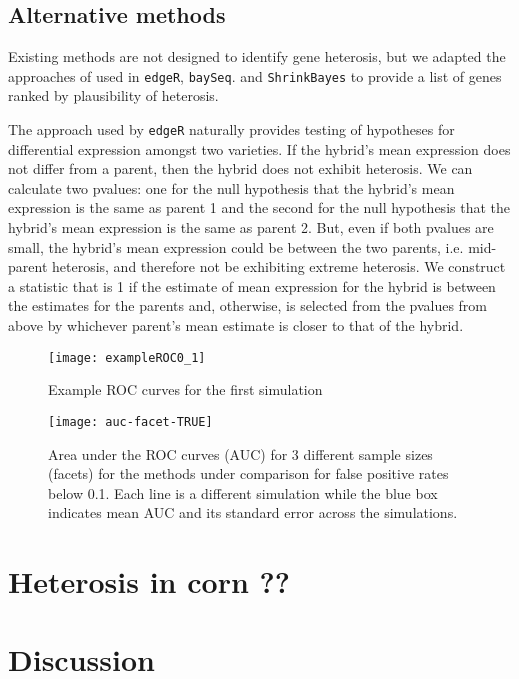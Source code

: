 \documentclass[useAMS,usenatbib,referee]{biom}
\begin{document}
\subsection{Alternative methods}

Existing methods are not designed to identify gene heterosis, but we adapted the approaches of used in {\tt edgeR}, {\tt baySeq}. and {\tt ShrinkBayes} to provide a list of genes ranked by plausibility of heterosis. 

The approach used by {\tt edgeR} naturally provides testing of hypotheses for differential expression amongst two varieties. If the hybrid's mean expression does not differ from a parent, then the hybrid does not exhibit heterosis. We can calculate two pvalues: one for the null hypothesis that the hybrid's mean expression is the same as parent 1 and the second for the null hypothesis that the hybrid's mean expression is the same as parent 2. But, even if both pvalues are small, the hybrid's mean expression could be between the two parents, i.e. mid-parent heterosis, and therefore not be exhibiting extreme heterosis. We construct a statistic that is 1 if the estimate of mean expression 
for the hybrid is between the estimates for the parents and, otherwise, is selected from the pvalues from above by whichever parent's mean estimate is closer to that of the hybrid. 





\begin{figure}[htbp]
\centerline{\texttt{[image: exampleROC0\_1]}}
\caption{Example ROC curves for the first simulation}
\label{f:roc}
\end{figure}

\begin{figure}
\centerline{\texttt{[image: auc-facet-TRUE]}}
\caption{Area under the ROC curves (AUC) for 3 different sample sizes (facets) for the methods under comparison for false positive rates below 0.1. Each line is a different simulation while the blue box indicates mean AUC and its standard error across the simulations.}
\end{figure}

\section{Heterosis in corn ??}
\label{s:corn}

\section{Discussion}
\label{s:discuss}
\end{document}
